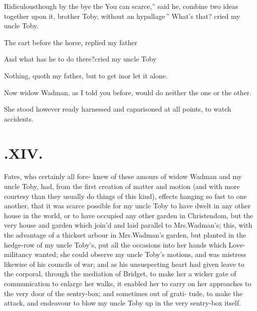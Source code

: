 \documentclass{article}
\begin{document}
\vskip -12pt
\noindent
\quad R\tspace idiculous\tsh though by the bye the
\lqq You can scarce,” said he, \lqq combine\break
\lqq two ideas together upon it, brother\break
\lqq Toby, without an hypallage\,”\tsh\break
What’s that? cried my uncle Toby.

The cart before the horse, replied my father\tsh

\tsh And what has he to do there?\break cried my uncle Toby\tsh

Nothing, quoth my father, but to get in\tsh or let it
alone.

Now widow Wadman, as I told you before, would do neither
the one or the other.

She stood however ready harnessed and caparisoned at all points,
to watch accidents.

\section{.\enspace XIV.}

 Fates, who certainly all fore-\break
knew of these amours of widow Wadman and my uncle
Toby, had, from the first creation of matter and\break
motion (and with more courtesy than they usually do things of this kind),\break
{}
effects hanging so fast to
one another, that it was scarce possible for my uncle Toby
to have dwelt in any other house in the world, or to have occupied
any other garden in Christendom, but the very house and
garden which join’d and
laid parallel to Mrs.\@ Wadman’s; this,\break
with the advantage of a thickset arbour\break
in Mrs.\@ Wadman’s garden, but planted\break
in the hedge-row of my uncle Toby’s,\break
put all the occasions into her hands\break
which Love-militancy wanted; she could\break
observe my uncle Toby’s motions, and\break
was mistress likewise of his councils of\break
war; and as his unsuspecting heart had\break
given leave to the corporal, through the\break
mediation of Bridget, to make her a\break
wicker gate of communication to enlarge\break
her walks, it enabled her to carry on\break
her approaches to the very door of the\break
sentry-box; and sometimes out of grati-\break
tude, to make the attack, and endeavour\break
to blow my uncle Toby up in the very\break
sentry-box itself.
\end{document}
